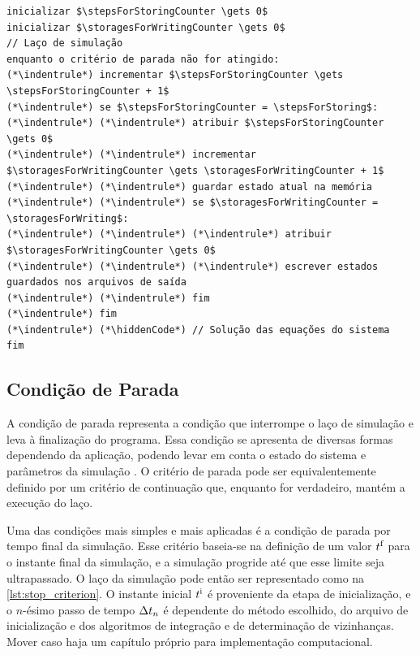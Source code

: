 \begin{lstlisting}[float, floatplacement=h, language=pseudocode, label=lst:data_exportation, caption=Pseudocódigo para a exportação de dados.]
inicializar $\stepsForStoringCounter \gets 0$
inicializar $\storagesForWritingCounter \gets 0$
// Laço de simulação 
enquanto o critério de parada não for atingido:
(*\indentrule*)	incrementar $\stepsForStoringCounter \gets \stepsForStoringCounter + 1$
(*\indentrule*)	se $\stepsForStoringCounter = \stepsForStoring$:
(*\indentrule*)	(*\indentrule*)	atribuir $\stepsForStoringCounter \gets 0$
(*\indentrule*)	(*\indentrule*)	incrementar $\storagesForWritingCounter \gets \storagesForWritingCounter + 1$
(*\indentrule*)	(*\indentrule*)	guardar estado atual na memória
(*\indentrule*)	(*\indentrule*)	se $\storagesForWritingCounter = \storagesForWriting$:
(*\indentrule*)	(*\indentrule*)	(*\indentrule*)	atribuir $\storagesForWritingCounter \gets 0$
(*\indentrule*)	(*\indentrule*)	(*\indentrule*)	escrever estados guardados nos arquivos de saída
(*\indentrule*)	(*\indentrule*)	fim 
(*\indentrule*)	fim
(*\indentrule*)	(*\hiddenCode*) // Solução das equações do sistema
fim
\end{lstlisting}

\subsection{Condição de Parada}

A condição de parada representa a condição que interrompe o laço de simulação e leva à finalização do programa. Essa condição se apresenta de diversas formas dependendo da aplicação, podendo levar em conta o estado do sistema e parâmetros da simulação \cite{bib:computational_granular_dynamics}. O critério de parada pode ser equivalentemente definido por um critério de continuação que, enquanto for verdadeiro, mantém a execução do laço.

Uma das condições mais simples e mais aplicadas é a condição de parada por tempo final da simulação. Esse critério baseia-se na definição de um valor \(\finalInstant\) para o instante final da simulação, e a simulação progride até que esse limite seja ultrapassado. O laço da simulação pode então ser representado como na \cref{lst:stop_criterion}. O instante inicial \(\initialInstant\) é proveniente da etapa de inicialização, e o \(n\)-ésimo passo de tempo \(\Dt[n]\) é dependente do método escolhido, do arquivo de inicialização e dos algoritmos de integração e de determinação de vizinhanças. \alert{Mover caso haja um capítulo próprio para implementação computacional.}

